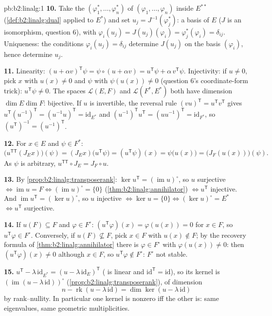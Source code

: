 \begin{solution}{pb:b2:linalg:1}
\textbf{10.} Take the  $(\varphi_1^*, \dots,
\varphi_n^*)$ of $(\varphi_1, \dots, \varphi_n)$ inside $E^{**}$
(\cref{def:b2:linalg:dual} applied to $E^*$) and set $u_j =
J^{-1}(\varphi_j^*)$: a basis of $E$ ($J$ is an isomorphism,
question 6), with $\varphi_i(u_j) = J(u_j)(\varphi_i) =
\varphi_j^*(\varphi_i) = \delta_{ij}$. Uniqueness: the conditions
$\varphi_i(u_j) = \delta_{ij}$ determine $J(u_j)$ on the basis
$(\varphi_i)$, hence determine $u_j$.

\textbf{11.} Linearity: $(u + \alpha v)^{\mathsf T}\psi = \psi
\circ (u + \alpha v) = u^{\mathsf T}\psi + \alpha\, v^{\mathsf
T}\psi$. Injectivity: if $u \neq 0$, pick $x$ with $u(x) \neq 0$
and $\psi$ with $\psi(u(x)) \neq 0$ (question 6's coordinate-form
trick): $u^{\mathsf T}\psi \neq 0$. The spaces $\mathcal{L}(E,F)$
and $\mathcal{L}(F^*, E^*)$ both have dimension $\dim E \dim F$:
bijective. If $u$ is invertible, the reversal rule $(vu)^{\mathsf
T} = u^{\mathsf T}v^{\mathsf T}$ gives $u^{\mathsf
T}(u^{-1})^{\mathsf T} = (u^{-1}u)^{\mathsf T} =
\mathrm{id}_{E^*}$ and $(u^{-1})^{\mathsf T}u^{\mathsf T} =
(uu^{-1})^{\mathsf T} = \mathrm{id}_{F^*}$, so $(u^{\mathsf
T})^{-1} = (u^{-1})^{\mathsf T}$.

\textbf{12.} For $x \in E$ and $\psi \in F^*$:
\[
\bigl(u^{\mathsf T\mathsf T}(J_E x)\bigr)(\psi)
= (J_E x)\bigl(u^{\mathsf T}\psi\bigr)
= (u^{\mathsf T}\psi)(x)
= \psi\bigl(u(x)\bigr)
= \bigl(J_F(u(x))\bigr)(\psi).
\]
As $\psi$ is arbitrary, $u^{\mathsf T\mathsf T} \circ J_E = J_F
\circ u$.

\textbf{13.} By \cref{prop:b2:linalg:transposerank}: $\ker
u^{\mathsf T} = (\operatorname{im} u)^\circ$, so $u$ surjective
$\iff \operatorname{im} u = F \iff (\operatorname{im}u)^\circ =
\{0\}$ (\cref{thm:b2:linalg:annihilator}) $\iff u^{\mathsf T}$
injective. And $\operatorname{im} u^{\mathsf T} = (\ker
u)^\circ$, so $u$ injective $\iff \ker u = \{0\} \iff (\ker
u)^\circ = E^*$ $\iff u^{\mathsf T}$ surjective.

\textbf{14.} If $u(F) \subseteq F$ and $\varphi \in F^\circ$:
$(u^{\mathsf T}\varphi)(x) = \varphi(u(x)) = 0$ for $x \in F$, so
$u^{\mathsf T}\varphi \in F^\circ$. Conversely, if $u(F)
\not\subseteq F$, pick $x \in F$ with $u(x) \notin F$; by the
recovery formula of \cref{thm:b2:linalg:annihilator} there is
$\varphi \in F^\circ$ with $\varphi(u(x)) \neq 0$: then
$(u^{\mathsf T}\varphi)(x) \neq 0$ although $x \in F$, so
$u^{\mathsf T}\varphi \notin F^\circ$: $F^\circ$ not stable.

\textbf{15.} $u^{\mathsf T} - \lambda\,\mathrm{id}_{E^*} = (u -
\lambda\,\mathrm{id}_E)^{\mathsf T}$ ( is linear and
$\mathrm{id}^{\mathsf T} = \mathrm{id}$), so its kernel is
$(\operatorname{im}(u - \lambda\,\mathrm{id}))^\circ$
(\cref{prop:b2:linalg:transposerank}), of dimension
\[
n - \operatorname{rk}(u - \lambda\,\mathrm{id})
= \dim\ker(u - \lambda\,\mathrm{id})
\]
by rank--nullity. In particular one kernel is nonzero iff the
other is: same eigenvalues, same geometric multiplicities.


\end{solution}

